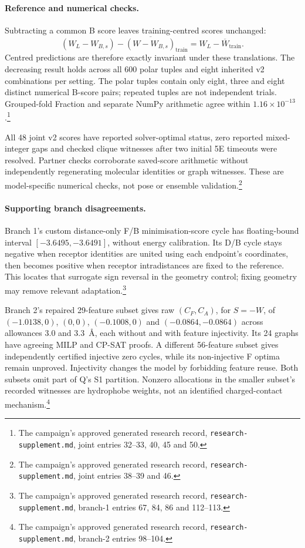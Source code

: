 \documentclass{article}
\newcommand{\rr}[1]{\footnote{The campaign's approved generated research record, \texttt{research-supplement.md}, #1.}}
\begin{document}
\paragraph{Reference and numerical checks.}
Subtracting a common B score leaves training-centred scores unchanged:
\[
 (W_L-W_{B,s})-\overline{(W-W_{B,s})}_{\mathrm{train}}
 =W_L-\overline W_{\mathrm{train}}.
\]
Centred predictions are therefore exactly invariant under these translations. The decreasing result holds across all 600 polar tuples and eight inherited v2 combinations per setting. The polar tuples contain only eight, three and eight distinct numerical B-score pairs; repeated tuples are not independent trials. Grouped-fold Fraction and separate NumPy arithmetic agree within \(1.16\times10^{-13}\).\rr{joint entries 32--33, 40, 45 and 50}

All 48 joint v2 scores have reported solver-optimal status, zero reported mixed-integer gaps and checked clique witnesses after two initial 5E timeouts were resolved. Partner checks corroborate saved-score arithmetic without independently regenerating molecular identities or graph witnesses. These are model-specific numerical checks, not pose or ensemble validation.\rr{joint entries 38--39 and 46}

\paragraph{Supporting branch disagreements.}
Branch 1's custom distance-only F/B minimisation-score cycle has floating-bound interval \([-3.6495,-3.6491]\), without energy calibration. Its D/B cycle stays negative when receptor identities are united using each endpoint's coordinates, then becomes positive when receptor intradistances are fixed to the reference. This locates that surrogate sign reversal in the geometry control; fixing geometry may remove relevant adaptation.\rr{branch-1 entries 67, 84, 86 and 112--113}

Branch 2's repaired 29-feature subset gives raw \((C_F,C_A)\), for \(S=-W\), of \((-1.0138,0)\), \((0,0)\), \((-0.1008,0)\) and \((-0.0864,-0.0864)\) across allowances 3.0 and 3.3~\AA, each without and with feature injectivity. Its 24 graphs have agreeing MILP and CP-SAT proofs. A different 56-feature subset gives independently certified injective zero cycles, while its non-injective F optima remain unproved. Injectivity changes the model by forbidding feature reuse. Both subsets omit part of Q's S1 partition. Nonzero allocations in the smaller subset's recorded witnesses are hydrophobe weights, not an identified charged-contact mechanism.\rr{branch-2 entries 98--104}
\end{document}
